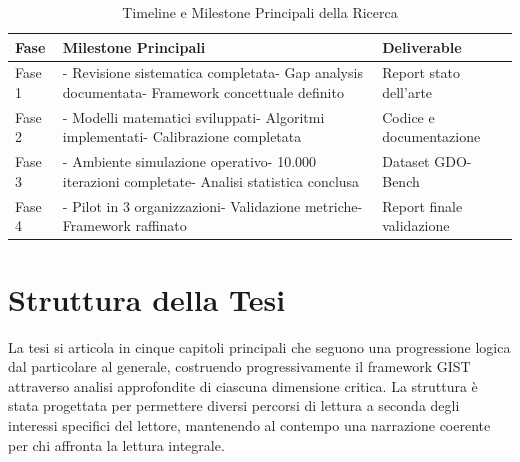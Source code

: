 \begin{table}[htbp]
\centering
\caption{Timeline e Milestone Principali della Ricerca}
\label{tab:timeline_ricerca}
\begin{tabularx}{\textwidth}{@{}lXl@{}}
\toprule
\textbf{Fase} & \textbf{Milestone Principali} & \textbf{Deliverable} \\
\midrule
Fase 1 &  - Revisione sistematica completata\newline- Gap analysis documentata\newline- Framework concettuale definito & Report stato dell'arte \\
Fase 2 & - Modelli matematici sviluppati\newline- Algoritmi implementati\newline- Calibrazione completata & Codice e documentazione \\
Fase 3 & - Ambiente simulazione operativo\newline- 10.000 iterazioni completate\newline- Analisi statistica conclusa & Dataset GDO-Bench \\
Fase 4 & - Pilot in 3 organizzazioni\newline- Validazione metriche\newline- Framework raffinato & Report finale validazione \\
\bottomrule
\end{tabularx}
\end{table}

\section{Struttura della Tesi}
\label{sec:struttura_tesi}

La tesi si articola in cinque capitoli principali che seguono una progressione logica dal particolare al generale, costruendo progressivamente il framework GIST attraverso analisi approfondite di ciascuna dimensione critica. La struttura è stata progettata per permettere diversi percorsi di lettura a seconda degli interessi specifici del lettore, mantenendo al contempo una narrazione coerente per chi affronta la lettura integrale.

